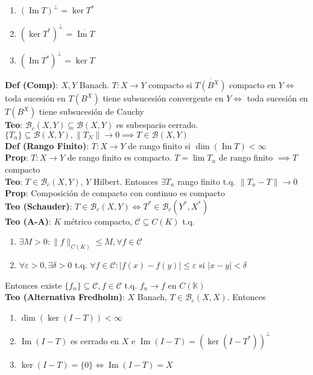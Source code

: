 \documentclass[9pt, letterpaper]{extarticle}
\newcommand{\K}{\mathbb{K}}
\begin{document}
\begin{multicols*}{2}
\begin{enumerate}
	\item $(\operatorname{Im}T)^\perp=\operatorname{ker} T^*$
	\item $(\operatorname{ker} T^*)^\perp= \overline{\operatorname{Im}T}$
	\item $(\operatorname{Im}T^*)^\perp=\operatorname{ker}T$
\end{enumerate}
\textbf{Def (Comp)}: $X,Y$ Banach. $T:X\to Y$ compacto si $\overline{T(B^X)}$ compacto en $Y\iff$ toda sucesión en $T(B^X)$ tiene subsucesión convergente en $Y\iff$ toda sucesión en $T(B^X)$ tiene subsucesión de Cauchy\\
\textbf{Teo}: $\mathcal{B}_c(X,Y)\subseteq \mathcal{B}(X,Y)$ es subespacio cerrado. $\{T_n\}\subseteq \mathcal{B}(X,Y), \|T_N\|\to 0\implies T\in\mathcal{B}(X,Y)$\\
\textbf{Def (Rango Finito)}: $T:X\to Y$ de rango finito si $\operatorname{dim}(\operatorname{Im} T)<\infty$\\
\textbf{Prop}: $T:X\to Y$ de rango finito es compacto. $T=\lim T_n$ de rango finito $\implies T$ compacto\\
\textbf{Teo}: $T\in\mathcal{B}_c(X,Y)$, $Y$ Hilbert. Entonces $\exists T_n$ rango finito t.q. $\|T_n-T\|\to 0$\\
\textbf{Prop}: Composición de compacto con continuo es compacto\\
\textbf{Teo (Schauder)}: $T\in\mathcal{B}_c(X,Y)\iff T^*\in\mathcal{B}_c(Y^*,X^*)$\\
\textbf{Teo (A-A)}: $K$ métrico compacto, $\mathcal{C}\subseteq C(K)$ t.q.\begin{enumerate}
	\item $\exists M>0:\|f\|_{C(K)}\leq M,\forall f\in \mathcal{C}$
	\item $\forall\varepsilon>0,\exists\delta>0$ t.q. $\forall f\in\mathcal{C}:|f(x)-f(y)|\leq \varepsilon$ si $|x-y|<\delta$
\end{enumerate} Entonces existe $\{f_n\}\subseteq \mathcal{C},f\in\mathcal{C}$ t.q. $f_n\to f$ en $C(\K)$\\
\textbf{\color{red}Teo (Alternativa Fredholm)}: $X$ Banach, $T\in\mathcal{B}_c(X,X)$. Entonces\begin{enumerate}
	\item $\operatorname{dim}(\operatorname{ker}(I-T))<\infty$
	\item $\operatorname{Im}(I-T)$ es cerrado en $X$ e $\operatorname{Im}(I-T)=(\operatorname{ker}(I-T^*))^\perp$
	\item $\operatorname{ker}(I-T)=\{0\}\iff \operatorname{Im}(I-T)=X$

\end{enumerate}
\end{multicols*}
\end{document}
